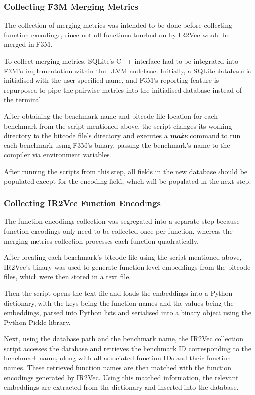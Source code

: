 \subsubsection{Collecting F3M Merging Metrics}
The collection of merging metrics was intended to be done before collecting function encodings, since not all functions touched on by IR2Vec would be merged in F3M.

To collect merging metrics, SQLite's C++ interface had to be integrated into F3M's implementation within the LLVM codebase. Initially, a SQLite database is initialised with the user-specified name, and F3M's reporting feature is repurposed to pipe the pairwise metrics into the initialised database instead of the terminal.

After obtaining the benchmark name and bitcode file location for each benchmark from the script mentioned above, the script changes its working directory to the bitcode file's directory and executes a \textbf{\textit{make}} command to run each benchmark using F3M's binary, passing the benchmark's name to the compiler via environment variables.

After running the scripts from this step, all fields in the new database should be populated except for the encoding field, which will be populated in the next step.

\subsubsection{Collecting IR2Vec Function Encodings}
The function encodings collection was segregated into a separate step because function encodings only need to be collected once per function, whereas the merging metrics collection processes each function quadratically.

After locating each benchmark's bitcode file using the script mentioned above, IR2Vec's binary was used to generate function-level embeddings from the bitcode files, which were then stored in a text file.

Then the script opens the text file and loads the embeddings into a Python dictionary, with the keys being the function names and the values being the embeddings, parsed into Python lists and serialised into a binary object using the Python Pickle library.

Next, using the database path and the benchmark name, the IR2Vec collection script accesses the database and retrieves the benchmark ID corresponding to the benchmark name, along with all associated function IDs and their function names. These retrieved function names are then matched with the function encodings generated by IR2Vec. Using this matched information, the relevant embeddings are extracted from the dictionary and inserted into the database.

